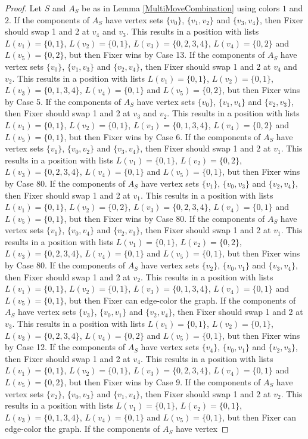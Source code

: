 \documentclass[12pt]{amsart}
\theoremstyle{plain}
\theoremstyle{definition}
\theoremstyle{remark}
\begin{document}
\begin{proof}
Let $S$ and $A_S$ be as in Lemma \ref{MultiMoveCombination} using colors $1$ and $2$. If the components of $A_S$ have vertex sets $\{v_0\}$, $\{v_1, v_2\}$ and $\{v_3, v_4\}$, then Fixer should swap 1 and 2 at $v_4$ and $v_3$. This results in a position with lists $L(v_1) = \{0, 1\}$, $L(v_2) = \{0, 1\}$, $L(v_3) = \{0, 2, 3, 4\}$, $L(v_4) = \{0, 2\}$ and $L(v_5) = \{0, 2\}$, but then Fixer wins by Case 13. If the components of $A_S$ have vertex sets $\{v_0\}$, $\{v_1, v_3\}$ and $\{v_2, v_4\}$, then Fixer should swap 1 and 2 at $v_4$ and $v_2$. This results in a position with lists $L(v_1) = \{0, 1\}$, $L(v_2) = \{0, 1\}$, $L(v_3) = \{0, 1, 3, 4\}$, $L(v_4) = \{0, 1\}$ and $L(v_5) = \{0, 2\}$, but then Fixer wins by Case 5. If the components of $A_S$ have vertex sets $\{v_0\}$, $\{v_1, v_4\}$ and $\{v_2, v_3\}$, then Fixer should swap 1 and 2 at $v_3$ and $v_2$. This results in a position with lists $L(v_1) = \{0, 1\}$, $L(v_2) = \{0, 1\}$, $L(v_3) = \{0, 1, 3, 4\}$, $L(v_4) = \{0, 2\}$ and $L(v_5) = \{0, 1\}$, but then Fixer wins by Case 6. If the components of $A_S$ have vertex sets $\{v_1\}$, $\{v_0, v_2\}$ and $\{v_3, v_4\}$, then Fixer should swap 1 and 2 at $v_1$. This results in a position with lists $L(v_1) = \{0, 1\}$, $L(v_2) = \{0, 2\}$, $L(v_3) = \{0, 2, 3, 4\}$, $L(v_4) = \{0, 1\}$ and $L(v_5) = \{0, 1\}$, but then Fixer wins by Case 80. If the components of $A_S$ have vertex sets $\{v_1\}$, $\{v_0, v_3\}$ and $\{v_2, v_4\}$, then Fixer should swap 1 and 2 at $v_1$. This results in a position with lists $L(v_1) = \{0, 1\}$, $L(v_2) = \{0, 2\}$, $L(v_3) = \{0, 2, 3, 4\}$, $L(v_4) = \{0, 1\}$ and $L(v_5) = \{0, 1\}$, but then Fixer wins by Case 80. If the components of $A_S$ have vertex sets $\{v_1\}$, $\{v_0, v_4\}$ and $\{v_2, v_3\}$, then Fixer should swap 1 and 2 at $v_1$. This results in a position with lists $L(v_1) = \{0, 1\}$, $L(v_2) = \{0, 2\}$, $L(v_3) = \{0, 2, 3, 4\}$, $L(v_4) = \{0, 1\}$ and $L(v_5) = \{0, 1\}$, but then Fixer wins by Case 80. If the components of $A_S$ have vertex sets $\{v_2\}$, $\{v_0, v_1\}$ and $\{v_3, v_4\}$, then Fixer should swap 1 and 2 at $v_2$. This results in a position with lists $L(v_1) = \{0, 1\}$, $L(v_2) = \{0, 1\}$, $L(v_3) = \{0, 1, 3, 4\}$, $L(v_4) = \{0, 1\}$ and $L(v_5) = \{0, 1\}$, but then Fixer can edge-color the graph. If the components of $A_S$ have vertex sets $\{v_3\}$, $\{v_0, v_1\}$ and $\{v_2, v_4\}$, then Fixer should swap 1 and 2 at $v_3$. This results in a position with lists $L(v_1) = \{0, 1\}$, $L(v_2) = \{0, 1\}$, $L(v_3) = \{0, 2, 3, 4\}$, $L(v_4) = \{0, 2\}$ and $L(v_5) = \{0, 1\}$, but then Fixer wins by Case 12. If the components of $A_S$ have vertex sets $\{v_4\}$, $\{v_0, v_1\}$ and $\{v_2, v_3\}$, then Fixer should swap 1 and 2 at $v_4$. This results in a position with lists $L(v_1) = \{0, 1\}$, $L(v_2) = \{0, 1\}$, $L(v_3) = \{0, 2, 3, 4\}$, $L(v_4) = \{0, 1\}$ and $L(v_5) = \{0, 2\}$, but then Fixer wins by Case 9. If the components of $A_S$ have vertex sets $\{v_2\}$, $\{v_0, v_3\}$ and $\{v_1, v_4\}$, then Fixer should swap 1 and 2 at $v_2$. This results in a position with lists $L(v_1) = \{0, 1\}$, $L(v_2) = \{0, 1\}$, $L(v_3) = \{0, 1, 3, 4\}$, $L(v_4) = \{0, 1\}$ and $L(v_5) = \{0, 1\}$, but then Fixer can edge-color the graph. If the components of $A_S$ have vertex 
\end{proof}
\end{document}
